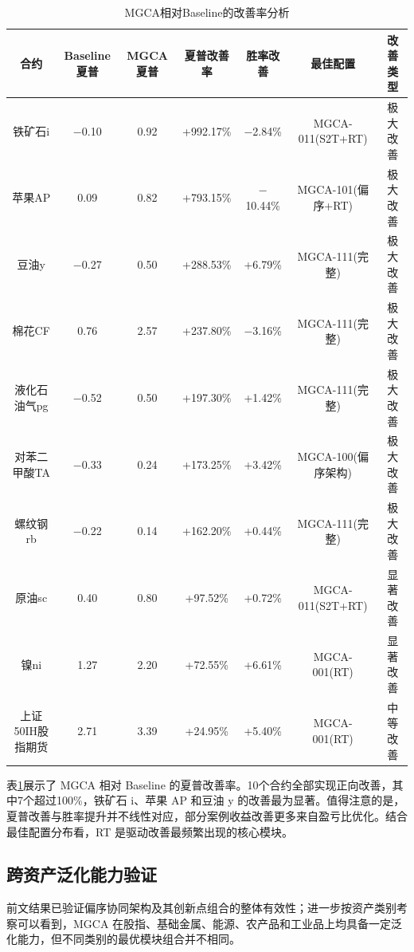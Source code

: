 \begin{table}[htbp]
\centering
\caption{MGCA相对Baseline的改善率分析}
\label{tab:mgcaImprovement}
\footnotesize
\setlength{\tabcolsep}{2.5pt}
\begin{tabular}{@{}ccccccc@{}}
\toprule
合约 & Baseline夏普 & MGCA夏普 & 夏普改善率 & 胜率改善 & 最佳配置 & 改善类型 \\
\midrule
铁矿石i  & $-$0.10 & 0.92 & +992.17\% & $-$2.84\%  & MGCA-011(S2T+RT) & 极大改善 \\
苹果AP & 0.09    & 0.82 & +793.15\% & $-$10.44\% & MGCA-101(偏序+RT) & 极大改善 \\
豆油y  & $-$0.27 & 0.50 & +288.53\% & +6.79\%    & MGCA-111(完整)   & 极大改善 \\
棉花CF & 0.76    & 2.57 & +237.80\% & $-$3.16\%  & MGCA-111(完整)   & 极大改善 \\
液化石油气pg & $-$0.52 & 0.50 & +197.30\% & +1.42\%    & MGCA-111(完整)   & 极大改善 \\
对苯二甲酸TA & $-$0.33 & 0.24 & +173.25\% & +3.42\%    & MGCA-100(偏序架构)    & 极大改善 \\
螺纹钢rb & $-$0.22 & 0.14 & +162.20\% & +0.44\%    & MGCA-111(完整)   & 极大改善 \\
原油sc & 0.40    & 0.80 & +97.52\%  & +0.72\%    & MGCA-011(S2T+RT) & 显著改善 \\
镍ni & 1.27    & 2.20 & +72.55\%  & +6.61\%    & MGCA-001(RT)     & 显著改善 \\
上证50IH股指期货 & 2.71    & 3.39 & +24.95\%  & +5.40\%    & MGCA-001(RT)     & 中等改善 \\
\bottomrule
\end{tabular}
\end{table}

表\ref{tab:mgcaImprovement}展示了 MGCA 相对 Baseline 的夏普改善率。10个合约全部实现正向改善，其中7个超过100\%，铁矿石 i、苹果 AP 和豆油 y 的改善最为显著。值得注意的是，夏普改善与胜率提升并不线性对应，部分案例收益改善更多来自盈亏比优化。结合最佳配置分布看，RT 是驱动改善最频繁出现的核心模块。

\subsection{跨资产泛化能力验证}
前文结果已验证偏序协同架构及其创新点组合的整体有效性；进一步按资产类别考察可以看到，MGCA 在股指、基础金属、能源、农产品和工业品上均具备一定泛化能力，但不同类别的最优模块组合并不相同。

